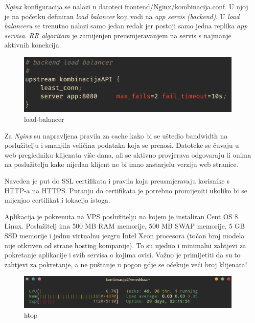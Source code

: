 		 \textit{Nginx} konfiguracija se nalazi u datoteci frontend/Nginx/kombinacija.conf. U njoj je na početku definiran  \textit{load balancer} koji vodi na  \textit{app servis (backend)}. U  \textit{load balanceru} se trenutno nalazi samo jedan redak jer postoji samo jedna replika  \textit{app servisa}.  \textit{RR algoritam} je zamijenjen preusmjeravanjem na servis s najmanje aktivnih konekcija.
		
		\begin{figure}[H]
					\includegraphics[scale=0.8]{figures/6-load-balancer.PNG}
					\centering
					\caption{load-balancer}
					\label{fig:load-balancer}
				\end{figure} 
		
		Za  \textit{Nginx} su napravljena pravila za cache kako bi se uštedio bandwidth na poslužitelju i smanjila veličina podataka koja se prenosi. Datoteke se čuvaju u web pregledniku klijenata više dana, ali se aktivno provjerava odgovaraju li onima na poslužitelju kako nijedan klijent ne bi imao zastarjelu verziju web stranice.
		
		Naveden je put do SSL certifikata i pravila koja preusmjeravaju korisnike s HTTP-a na HTTPS. Putanju do certifikata je potrebno promijeniti ukoliko bi se mijenjao certifikat i lokacija istoga.\\
		
		
		Aplikacija je pokrenuta na VPS poslužitelju na kojem je instaliran Cent OS 8 Linux. Poslužitelj ima 500 MB RAM memorije, 500 MB SWAP memorije, 5 GB SSD memorije i jednu virtualnu jezgru Intel Xeon procesora (točan broj modela nije otkriven od strane hosting kompanije). To su ujedno i minimalni zahtjevi za pokretanje aplikacije i svih servisa o kojima ovisi. Važno je primijetiti da su to zahtjevi za pokretanje, a ne puštanje u pogon gdje se očekuje veći broj klijenata!
		
		\begin{figure}[H]
					\includegraphics[scale=0.8]{figures/7-htop.PNG}
					\centering
					\caption{htop}
					\label{fig:htop}
				\end{figure} 
		
		\eject 